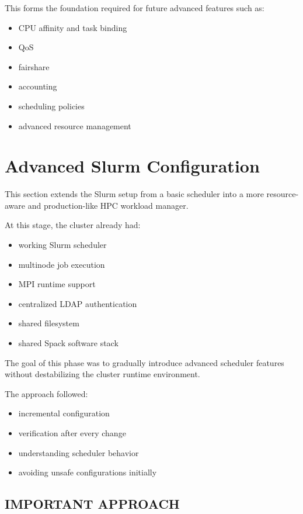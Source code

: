 \documentclass[11pt]{article}
\begin{document}
This forms the foundation required for future advanced features such as:

\begin{itemize}
\item CPU affinity and task binding
\item QoS
\item fairshare
\item accounting
\item scheduling policies
\item advanced resource management
\end{itemize}
\section{Advanced Slurm Configuration}
\label{sec:org5b51f68}

This section extends the Slurm setup from a basic scheduler into a more
resource-aware and production-like HPC workload manager.

At this stage, the cluster already had:

\begin{itemize}
\item working Slurm scheduler
\item multinode job execution
\item MPI runtime support
\item centralized LDAP authentication
\item shared filesystem
\item shared Spack software stack
\end{itemize}

The goal of this phase was to gradually introduce advanced scheduler
features without destabilizing the cluster runtime environment.

The approach followed:

\begin{itemize}
\item incremental configuration
\item verification after every change
\item understanding scheduler behavior
\item avoiding unsafe configurations initially
\end{itemize}
\subsection{IMPORTANT APPROACH}
\label{sec:org452122a}
\end{document}
